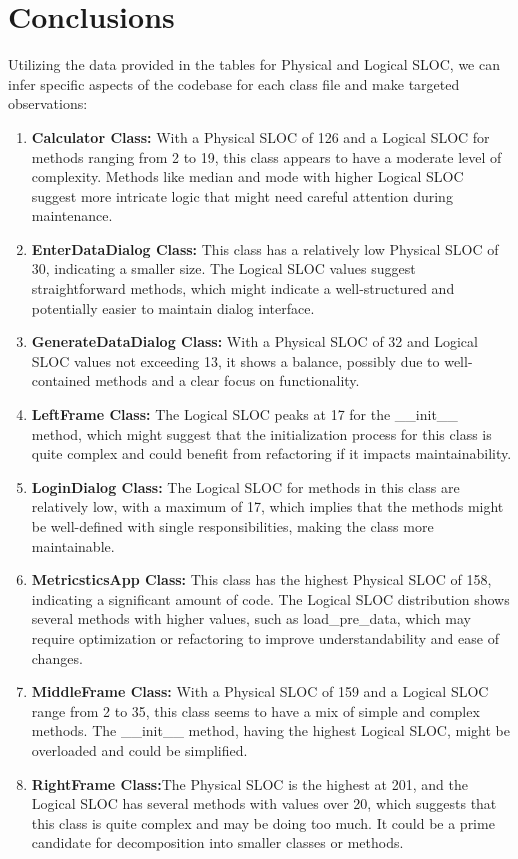 \documentclass[english,12pt,a4paper]{report}
\begin{document}
	
	\section{Conclusions}
	Utilizing the data provided in the tables for Physical and Logical SLOC, we can infer specific aspects of the codebase for each class file and make targeted observations:
	
	\begin{enumerate}
		\item \textbf{Calculator Class:} With a Physical SLOC of 126 and a Logical SLOC for methods ranging from 2 to 19, this class appears to have a moderate level of complexity. Methods like median and mode with higher Logical SLOC suggest more intricate logic that might need careful attention during maintenance.
		\item \textbf{EnterDataDialog Class:} This class has a relatively low Physical SLOC of 30, indicating a smaller size. The Logical SLOC values suggest straightforward methods, which might indicate a well-structured and potentially easier to maintain dialog interface.
		\item \textbf{GenerateDataDialog Class:} With a Physical SLOC of 32 and Logical SLOC values not exceeding 13, it shows a balance, possibly due to well-contained methods and a clear focus on functionality.
		\item \textbf{LeftFrame Class:} The Logical SLOC peaks at 17 for the \_\_init\_\_ method, which might suggest that the initialization process for this class is quite complex and could benefit from refactoring if it impacts maintainability.
		\item \textbf{LoginDialog Class:} The Logical SLOC for methods in this class are relatively low, with a maximum of 17, which implies that the methods might be well-defined with single responsibilities, making the class more maintainable.
		\item \textbf{MetricsticsApp Class:} This class has the highest Physical SLOC of 158, indicating a significant amount of code. The Logical SLOC distribution shows several methods with higher values, such as load\_pre\_data, which may require optimization or refactoring to improve understandability and ease of changes.
		\item \textbf{MiddleFrame Class:} With a Physical SLOC of 159 and a Logical SLOC range from 2 to 35, this class seems to have a mix of simple and complex methods. The \_\_init\_\_ method, having the highest Logical SLOC, might be overloaded and could be simplified.
		\item \textbf{RightFrame Class:}The Physical SLOC is the highest at 201, and the Logical SLOC has several methods with values over 20, which suggests that this class is quite complex and may be doing too much. It could be a prime candidate for decomposition into smaller classes or methods.
	\end{enumerate}
\end{document}
